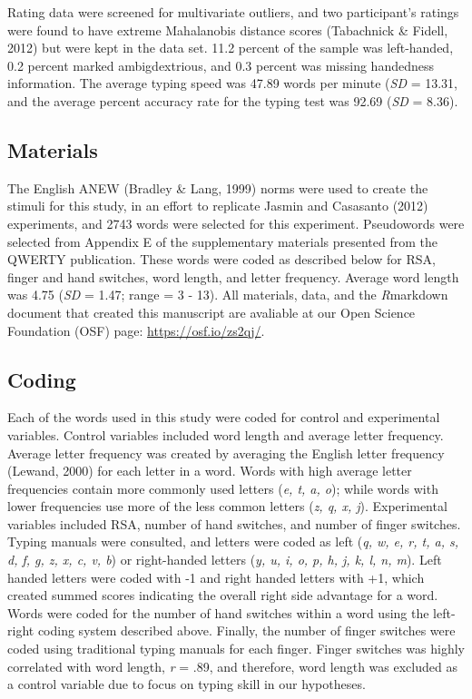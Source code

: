 \documentclass[english,man]{apa6}
\theoremstyle{definition}
\theoremstyle{definition}
\theoremstyle{definition}
\theoremstyle{remark}
\begin{document}
Rating data were screened for multivariate outliers, and two
participant's ratings were found to have extreme Mahalanobis distance
scores (Tabachnick \& Fidell, 2012) but were kept in the data set. 11.2
percent of the sample was left-handed, 0.2 percent marked
ambigdextrious, and 0.3 percent was missing handedness information. The
average typing speed was 47.89 words per minute (\emph{SD} = 13.31, and
the average percent accuracy rate for the typing test was 92.69
(\emph{SD} = 8.36).

\subsection{Materials}\label{materials}

The English ANEW (Bradley \& Lang, 1999) norms were used to create the
stimuli for this study, in an effort to replicate Jasmin and Casasanto
(2012) experiments, and 2743 words were selected for this experiment.
Pseudowords were selected from Appendix E of the supplementary materials
presented from the QWERTY publication. These words were coded as
described below for RSA, finger and hand switches, word length, and
letter frequency. Average word length was 4.75 (\emph{SD} = 1.47; range
= 3 - 13). All materials, data, and the \emph{R}markdown document that
created this manuscript are avaliable at our Open Science Foundation
(OSF) page: \url{https://osf.io/zs2qj/}.

\subsection{Coding}\label{coding}

Each of the words used in this study were coded for control and
experimental variables. Control variables included word length and
average letter frequency. Average letter frequency was created by
averaging the English letter frequency (Lewand, 2000) for each letter in
a word. Words with high average letter frequencies contain more commonly
used letters (\emph{e, t, a, o}); while words with lower frequencies use
more of the less common letters (\emph{z, q, x, j}). Experimental
variables included RSA, number of hand switches, and number of finger
switches. Typing manuals were consulted, and letters were coded as left
(\emph{q, w, e, r, t, a, s, d, f, g, z, x, c, v, b}) or right-handed
letters (\emph{y, u, i, o, p, h, j, k, l, n, m}). Left handed letters
were coded with -1 and right handed letters with +1, which created
summed scores indicating the overall right side advantage for a word.
Words were coded for the number of hand switches within a word using the
left-right coding system described above. Finally, the number of finger
switches were coded using traditional typing manuals for each finger.
Finger switches was highly correlated with word length, \emph{r} = .89,
and therefore, word length was excluded as a control variable due to
focus on typing skill in our hypotheses.
\end{document}
